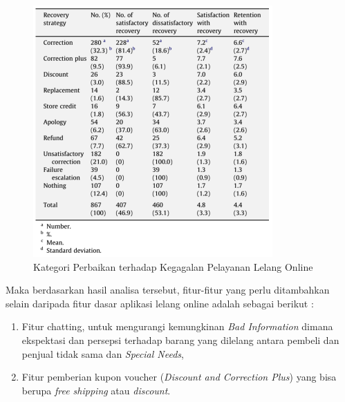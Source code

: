 	  \begin{figure}[H]
        \centering
        \includegraphics[width=\linewidth]{images/bab3/Solusi-Perbaikan-Ketidakpuasan.png}
        \caption{Kategori Perbaikan terhadap Kegagalan Pelayanan Lelang Online}
        \label{service-recovery-strategies}
      \end{figure}
      
      \indent Maka berdasarkan hasil analisa tersebut, fitur-fitur yang perlu ditambahkan selain daripada fitur dasar aplikasi lelang online adalah sebagai berikut :
      \begin{enumerate}
      \item Fitur chatting, untuk mengurangi kemungkinan \textit{Bad Information} dimana ekspektasi dan persepsi terhadap barang yang dilelang antara pembeli dan penjual tidak sama dan \textit{Special Needs}, 
      \item Fitur pemberian kupon voucher (\textit{Discount and Correction Plus}) yang bisa berupa \textit{free shipping} atau \textit{discount}.
      \end{enumerate}
  